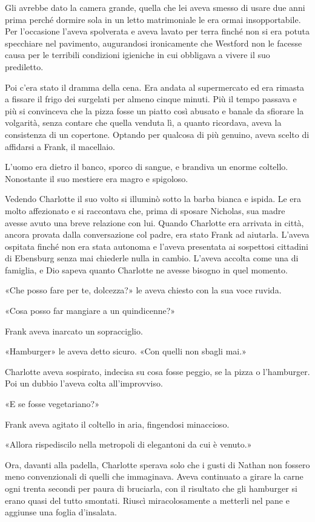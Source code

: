 \documentclass[a4paper,oneside,9pt]{memoir}
\begin{document}
Gli avrebbe dato la camera grande, quella che lei aveva smesso di usare due anni prima perché dormire sola in un letto
matrimoniale le era ormai insopportabile. Per l'occasione l'aveva spolverata e aveva lavato per terra finché non si era
potuta specchiare nel pavimento, augurandosi ironicamente che Westford non le facesse causa per le terribili condizioni
igieniche in cui obbligava a vivere il suo prediletto.

Poi c'era stato il dramma della cena. Era andata al supermercato ed era rimasta a fissare il frigo dei surgelati per
almeno cinque minuti. Più il tempo passava e più si convinceva che la pizza fosse un piatto così abusato e banale da
sfiorare la volgarità, senza contare che quella venduta lì, a quanto ricordava, aveva la consistenza di un copertone.
Optando per qualcosa di più genuino, aveva scelto di affidarsi a Frank, il macellaio.

L'uomo era dietro il banco, sporco di sangue, e brandiva un enorme coltello. Nonostante il suo mestiere era magro e
spigoloso.

Vedendo Charlotte il suo volto si illuminò sotto la barba bianca e ispida. Le era molto affezionato e si raccontava
che, prima di sposare Nicholas, sua madre avesse avuto una breve relazione con lui. Quando Charlotte era arrivata in
città, ancora provata dalla conversazione col padre, era stato Frank ad aiutarla. L'aveva ospitata finché non era
stata autonoma e l'aveva presentata ai sospettosi cittadini di Ebensburg senza mai chiederle nulla in cambio. L'aveva
accolta come una di famiglia, e Dio sapeva quanto Charlotte ne avesse bisogno in quel momento.

«Che posso fare per te, dolcezza?» le aveva chiesto con la sua voce ruvida.

«Cosa posso far mangiare a un quindicenne?»

Frank aveva inarcato un sopracciglio.

«Hamburger» le aveva detto sicuro. «Con quelli non sbagli mai.»

Charlotte aveva sospirato, indecisa su cosa fosse peggio, se la pizza o l'hamburger. Poi un dubbio l'aveva colta
all'improvviso.

«E se fosse vegetariano?»

Frank aveva agitato il coltello in aria, fingendosi minaccioso.

«Allora rispediscilo nella metropoli di elegantoni da cui è venuto.»

Ora, davanti alla padella, Charlotte sperava solo che i gusti di Nathan non fossero meno convenzionali di quelli che
immaginava. Aveva continuato a girare la carne ogni trenta secondi per paura di bruciarla, con il risultato che gli
hamburger si erano quasi del tutto smontati. Riuscì miracolosamente a metterli nel pane e aggiunse una foglia
d'insalata.
\end{document}
